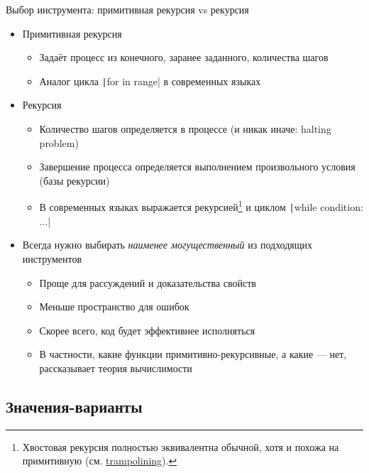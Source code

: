    \begin{frame}[fragile]{Выбор инструмента: примитивная рекурсия vs рекурсия \popslide}
        \begin{itemize}
            \item Примитивная рекурсия
            \begin{itemize}
                \item Задаёт процесс из конечного, заранее заданного, количества шагов
                \item Аналог цикла \texttt|for in range| в современных языках
            \end{itemize}
            \item Рекурсия
            \begin{itemize}
                \item Количество шагов определяется в процессе (и никак иначе: halting problem)
                \item Завершение процесса определяется выполнением произвольного условия (базы рекурсии)
                \item В современных языках выражается рекурсией\footnote{Хвостовая рекурсия полностью эквивалентна обычной, хотя и похожа на примитивную (см. \href{https://en.wikipedia.org/wiki/Trampoline\_(computing)\#High-level_programming}{\color{blue} trampolining}).} и циклом \texttt|while condition: ...|
            \end{itemize}
            \item Всегда нужно выбирать \emph{наименее могущественный} из подходящих инструментов
            \begin{itemize}
                \item Проще для рассуждений и доказательства свойств
                \item Меньше пространство для ошибок
                \item Скорее всего, код будет эффективнее исполняться
                \item В частности, какие функции примитивно-рекурсивные, а какие --- нет, рассказывает теория вычислимости
            \end{itemize}
        \end{itemize}
    \end{frame}


    \subsection{Значения-варианты}


